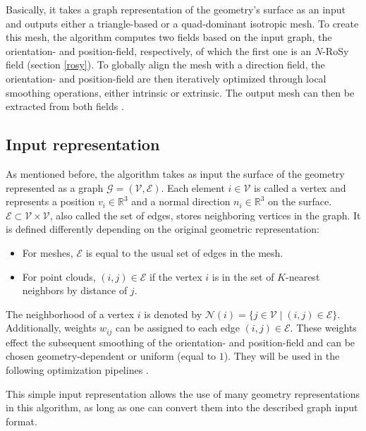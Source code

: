\documentclass{ACGSeminar}
\begin{document}
Basically, it takes a graph representation of the geometry's surface as an input and outputs either a triangle-based or a quad-dominant isotropic mesh. To create this mesh, the algorithm computes two fields based on the input graph, the orientation- and position-field, respectively, of which the first one is an $N$-RoSy field (section \ref{rosy}). To globally align the mesh with a direction field, the orientation- and position-field are then iteratively optimized through local smoothing operations, either intrinsic or extrinsic. The output mesh can then be extracted from both fields \cite{jakob2015instant}.

\subsection{Input representation}
As mentioned before, the algorithm takes as input the surface of the geometry represented as a graph $\mathcal{G} = (\mathcal{V}, \mathcal{E})$. Each element $i \in \mathcal{V}$ is called a vertex and represents a position $v_i \in \mathbb{R}^3$ and a normal direction $n_i \in \mathbb{R}^3$ on the surface. $\mathcal{E} \subset \mathcal{V} \times \mathcal{V}$, also called the set of edges, stores neighboring vertices in the graph. It is defined differently depending on the original geometric representation:
\begin{itemize}
	\item	For meshes, $\mathcal{E}$ is equal to the usual set of edges in the mesh.
	\item	For point clouds, $(i,j) \in \mathcal{E}$ if the vertex $i$ is in the set of $K$-nearest neighbors by distance of $j$.
\end{itemize}
The neighborhood of a vertex $i$ is denoted by $\mathcal{N}(i) = \{j \in \mathcal{V} \mid (i,j) \in \mathcal{E}\}$. Additionally, weights $w_{ij}$ can be assigned to each edge $(i,j) \in \mathcal{E}$. These weights effect the subsequent smoothing of the orientation- and position-field and can be chosen geometry-dependent or uniform (equal to $1$). They will be used in the following optimization pipelines \cite{jakob2015instant}.\bigskip

This simple input representation allows the use of many geometry representations in this algorithm, as long as one can convert them into the described graph input format.

\end{document}
